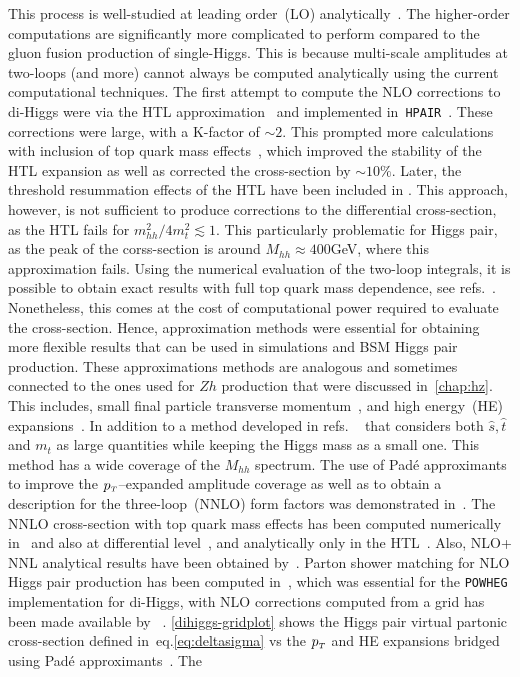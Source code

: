 This process is well-studied at leading order~(LO) analytically~\cite{EBOLI1987269, GLOVER1988282, DICUS1988457, Plehn:1996wb}.  The higher-order computations are significantly more complicated to perform compared to the gluon fusion production of single-Higgs. This is because multi-scale amplitudes at two-loops (and more) cannot always be computed analytically using the current computational techniques.  The first attempt to compute the NLO corrections to di-Higgs were via the HTL approximation~\cite{Dawson:1998py, Altenkamp:2012sx,Grigo:2014jma} and implemented in~\texttt{HPAIR}~\cite{Plehn:1996wb}. These corrections were large, with a K-factor of $ \sim 2$.  This prompted more calculations with inclusion of top quark mass effects~\cite{deFlorian:2013uza,Grigo:2013rya,Maltoni:2014eza,Grigo:2015dia,Degrassi:2016vss}, which improved the stability of the HTL expansion as well as corrected the cross-section by $\sim 10\%$. Later, the threshold resummation effects of the HTL have been included in \cite{Shao:2013bz}. This approach, however, is not sufficient to produce corrections to the differential cross-section, as the HTL fails for $m_{hh}^2/4m_t^2 \lesssim 1$. This particularly problematic for Higgs pair, as the peak of the corss-section is around $ M_{hh}\approx 400$GeV, where this approximation fails. Using the numerical evaluation of the two-loop integrals, it is possible to obtain exact results with full top quark mass dependence, see refs.~\cite{Borowka:2016ypz,Borowka:2016ehy,Baglio:2018lrj}. Nonetheless, this comes at the cost of computational power required to evaluate the cross-section.  Hence, approximation methods were essential for obtaining more flexible results that can be used in simulations and BSM Higgs pair production.  These approximations methods are analogous and sometimes connected to the ones used for $Zh$ production that were discussed in~\autoref{chap:hz}. This includes, small final particle transverse momentum~\cite{Bonciani:2018omm}, and high energy~(HE) expansions~\cite{Davies:2018ood}. In addition to a method developed in refs. ~\cite{Xu:2018eos,Wang:2020nnr} that considers both $\hat s, \hat t$ and $m_t$ as large quantities while keeping the Higgs mass as a small one. This method has a wide coverage of the $M_{hh}$ spectrum.  The use of Pad\'e approximants to improve the $p_{\scriptscriptstyle T}$--expanded amplitude coverage as well as to obtain a description for the three-loop~(NNLO) form factors was demonstrated in~\cite{Davies:2019nhm}. The NNLO cross-section with top quark mass effects has been computed numerically in~\cite{Grazzini:2018bsd} and also at differential level~\cite{deFlorian:2016uhr}, and analytically only in the HTL~\cite{deFlorian:2013jea}. Also, NLO+ NNL analytical results have been obtained by~\cite{deFlorian:2015moa}. Parton shower matching for NLO Higgs pair production has been computed  in~\cite{Jones:2017giv,Heinrich:2019bkc}, which was essential for the \texttt{POWHEG} implementation for di-Higgs, with NLO corrections computed from a grid has been made available by ~\cite{Heinrich:2017kxx,Heinrich:2019bkc,Heinrich:2020ckp}. \autoref{dihiggs-gridplot} shows the Higgs pair virtual partonic cross-section defined in~eq.\eqref{eq:deltasigma} vs the  $p_{\scriptscriptstyle T}$ and HE expansions bridged using Pad\'e  approximants~\cite{Bellafronte:2022jmo}.  The 